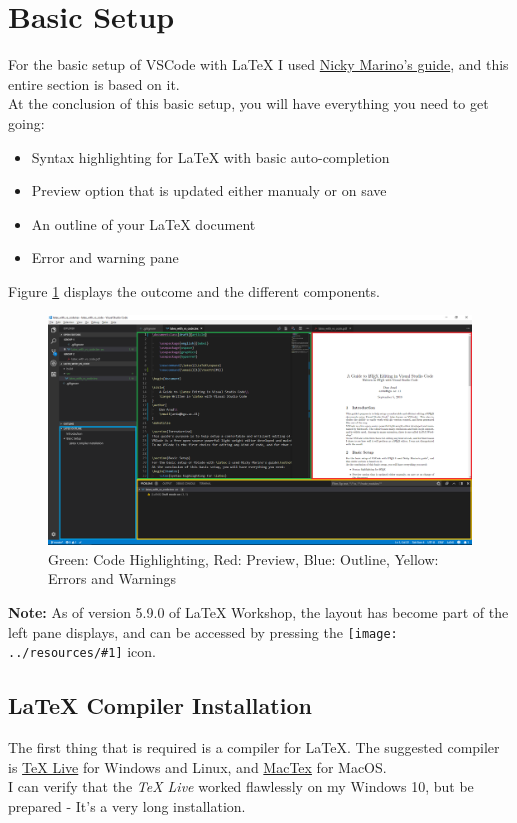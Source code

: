 \documentclass{article}
\newcommand{\latex}{\LaTeX\xspace}
\newcommand{\icon}[2]{\texttt{[image: ../resources/\#1]}\xspace}
\begin{document}
\section{Basic Setup} \label{sec:basic_setup}
For the basic setup of VSCode with \latex I used \href{https://dev.to/nickymarino/lets-use-latex}{Nicky Marino's guide}, and this entire section is based on it.\\
At the conclusion of this basic setup, you will have everything you need to get going:
\begin{itemize}
	\item{Syntax highlighting for \latex with basic auto-completion}
	\item{Preview option that is updated either manualy or on save}
	\item{An outline of your \latex document}
	\item{Error and warning pane}
\end{itemize}
Figure \ref{fig:vscode_with_latex_highlights} displays the outcome and the different components.\\
\begin{figure}
	\includegraphics[width=\linewidth]{../resources/vscode_with_latex_highlights.png}
	\caption{Green: Code Highlighting, Red: Preview, Blue: Outline, Yellow: Errors and Warnings}
	\label{fig:vscode_with_latex_highlights}
\end{figure}
\textbf{Note:} As of version 5.9.0 of \latex Workshop, the layout has become part of the left pane displays, and can be accessed by pressing the \icon{tex_icon.png}{0.3} icon.

\subsection{\latex Compiler Installation}
The first thing that is required is a compiler for \latex. The suggested compiler is \href{https://www.tug.org/texlive/}{TeX Live} for Windows and Linux, and \href{https://www.tug.org/mactex/}{MacTex} for MacOS.\\
I can verify that the \emph{TeX Live} worked flawlessly on my Windows 10, but be prepared - It's a very long installation.
\end{document}
